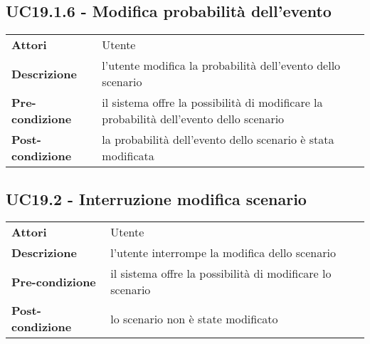 \subsection{UC19.1.6 - Modifica probabilità dell'evento}
\label{sssec:UC19.1.6}
\def\arraystretch{1.5}
\begin{tabularx}{\textwidth}{l|p{}}
\rowcolor{I} \multicolumn{2}{c}{\color{white}\textbf{UC19.1.6 - Modifica probabilità dell'evento}} \\
\toprule
\endhead
\textbf{Attori} & Utente\\
\textbf{Descrizione} & l'utente modifica la probabilità dell'evento dello scenario\\
\textbf{Pre-condizione} & il sistema offre la possibilità di modificare la probabilità dell'evento dello scenario\\
\textbf{Post-condizione} & la probabilità dell'evento dello scenario è stata modificata\\
\bottomrule
\end{tabularx}
\subsection{UC19.2 - Interruzione modifica scenario}
\label{sssec:UC19.2}
\def\arraystretch{1.5}
\begin{tabularx}{\textwidth}{l|p{}}
\rowcolor{I} \multicolumn{2}{c}{\color{white}\textbf{UC19.2 - Interruzione modifica scenario}} \\
\toprule
\endhead
\textbf{Attori} & Utente\\
\textbf{Descrizione} & l'utente interrompe la modifica dello scenario\\
\textbf{Pre-condizione} & il sistema offre la possibilità di modificare lo scenario\\
\textbf{Post-condizione} & lo scenario non è state modificato\\
\bottomrule
\end{tabularx}
